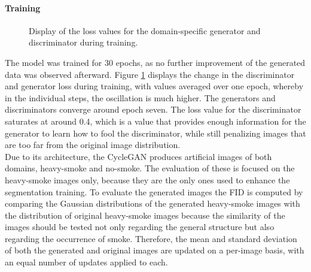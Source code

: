 \paragraph*{Training}
\begin{figure}[bt]
    \centering
    \hfill
    
    \vspace{0.5cm}
    
    \hfill
    
    \caption[CycleGAN loss curves]{Display of the loss values for the domain-specific generator and discriminator during training.}\label{fig:cycle_disc_gen_loss}
\end{figure}
The model was trained for 30 epochs, as no further improvement of the generated data was observed afterward.
Figure \ref{fig:cycle_disc_gen_loss} displays the change in the discriminator and generator loss during training, with values averaged over one epoch, whereby in the individual steps, the oscillation is much higher.
The generators and discriminators converge around epoch seven.
The loss value for the discriminator saturates at around 0.4, which is a value that provides enough information for the generator to learn how to fool the discriminator, while still penalizing images that are too far from the original image distribution.\\
Due to its architecture, the CycleGAN produces artificial images of both domains, heavy-smoke and no-smoke.
The evaluation of these is focused on the heavy-smoke images only, because they are the only ones used to enhance the segmentation training.
To evaluate the generated images the FID is computed by comparing the Gaussian distributions of the generated heavy-smoke images with the distribution of original heavy-smoke images because the similarity of the images should be tested not only regarding the general structure but also regarding the occurrence of smoke.
Therefore, the mean and standard deviation of both the generated and original images are updated on a per-image basis, with an equal number of updates applied to each.
